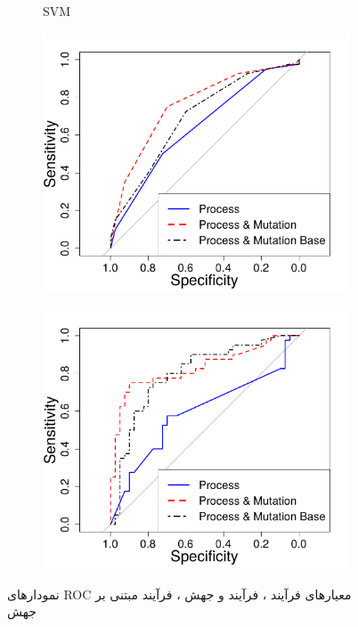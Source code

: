 \begin{figure}[H]
\begin{subfigure}{.5\textwidth}
		\caption{SVM}
	\end{subfigure}
	\begin{subfigure}{.5\textwidth}
		\centering
		\includegraphics[width= \linewidth]{img/evaluation/phase2-part1-roc-lr.pdf}
		\caption{}
	\end{subfigure}
	\begin{subfigure}{.5\textwidth}
		\centering
		\includegraphics[width= \linewidth]{img/evaluation/phase2-part1-roc-nn.pdf}
		\caption{}
	\end{subfigure}
	\caption{نمودارهای ROC معیارهای فرآیند ، فرآیند و جهش ، فرآیند مبتنی بر جهش}
	\label{fig:ROC-phase2-part1}
\end{figure}

